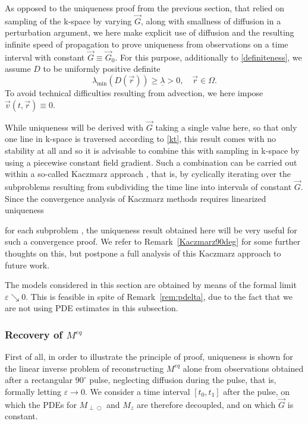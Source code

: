 \documentclass{ws-m3as}
\def\Mpp{M_{\perp\!\!\!\!\!\bigcirc}}
\newcommand\taup{\varepsilon}
\newcommand{\revision}[1]{{ #1}}
\newcommand{\Margin}[1]{}
\begin{document}
As opposed to the uniqueness proof from the previous section, that relied on sampling of the k-space by varying $\vec G$, along with smallness of diffusion in a perturbation argument, we here make explicit use of diffusion and the resulting infinite speed of propagation to prove uniqueness from observations on a time interval with constant $\vec G\equiv \vec G_0$.
For this purpose, additionally to \eqref{definiteness}, we assume $D$ to be uniformly positive definite
\begin{equation}\label{Dposdef}
\lambda_{\min}(D(\vec r))\geq\underline{\lambda}>0, \quad \vec r\in\Omega.
\end{equation}
To avoid technical difficulties resulting from advection, we here impose $\vec v(t,\vec r)\equiv0$.

While uniqueness will be derived with $\vec G$ taking a single value here, so that only one line in k-space is traversed according to \eqref{kt}, this result comes with no stability at all and so it is advisable to combine this with sampling in k-space by using a piecewise constant field gradient. Such a combination can be carried out within a so-called Kaczmarz approach \cite{BKL:2010,NewtonKaczmarz,HLS:07,HKLS:07,aao_time,KoSc:2002,Ngu:2019}, that is, by cyclically iterating over the subproblems resulting from subdividing the time line into intervals of constant $\vec G$. Since the convergence analysis of Kaczmarz methods requires linearized 
\revision{uniqueness} 
\Margin{R2 9)}
for each subproblem \cite{NewtonKaczmarz}, the uniqueness result obtained here will be very useful for such a convergence proof.
We refer to Remark~\ref{Kaczmarz90deg} for some further thoughts on this, but postpone a full analysis of this Kaczmarz approach to future work.

The models considered in this section are obtained by means of the formal limit $\taup\searrow0$. This is feasible in spite of Remark~\ref{rem:pdelta}, due to the fact that we are not using PDE estimates in this subsection.

\subsubsection{Recovery of $M^{eq}$}
First of all, in order to illustrate the principle of proof, uniqueness is shown for the linear inverse problem of reconstructing $M^{eq}$ alone from observations obtained after a rectangular $90^\circ$ pulse, neglecting diffusion during the pulse, that is, formally letting $\taup\to0$. 
We consider a time interval $[t_0,t_1]$ after the pulse, on which the PDEs for $\Mpp$ and $M_z$ are therefore decoupled, and on which $\vec G$ is constant. 
\end{document}
